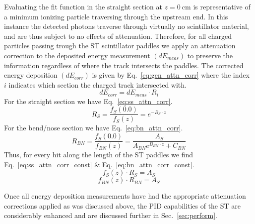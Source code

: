Evaluating the fit function in the straight section at $z = 0\ \mathrm{cm}$ is representative of a minimum ionizing particle traversing through the upstream end.  In this instance the detected photons traverse through virtually no scintillator material, and are thus subject to no effects of attenuation.  Therefore, for all charged particles passing trough the ST scintillator paddles we apply an attenuation correction to the deposited energy measurement $(dE_{meas})$ to preserve the information regardless of where the track intersects the paddles.  The corrected energy deposition $(dE_{corr})$ is given by Eq.~\ref{eq:gen_attn_corr} where the index $i$ indicates which section the charged track intersected with.
	\begin{equation} \label{eq:gen_attn_corr}
		dE_{corr} = dE_{meas} \cdot R_{i}
	\end{equation}
For the straight section we have Eq.~\ref{eq:ss_attn_corr}.
	\begin{equation} \label{eq:ss_attn_corr}
		R_{S} = \frac{f_{S}(0.0)}{f_{S}(z)} = e^{-B_{S} \cdot z}
	\end{equation}
For the bend/nose section we have Eq.~\ref{eq:bn_attn_corr}.
	\begin{equation} \label{eq:bn_attn_corr}
		R_{BN} = \frac{f_{S}(0.0)}{f_{BN}(z)} = \frac{A_{S}}{A_{BN}e^{B_{BN} \cdot z} + C_{BN}}
	\end{equation}
Thus, for every hit along the length of the ST paddles we find Eq.~\ref{eq:ss_attn_corr_const} \& Eq.~\ref{eq:bn_attn_corr_const}.
	\begin{equation} \label{eq:ss_attn_corr_const}
		f_{S}(z) \cdot R_{S} = A_{S}
	\end{equation}
	\begin{equation} \label{eq:bn_attn_corr_const}
		f_{BN}(z) \cdot R_{BN} = A_{S}
	\end{equation}

Once all energy deposition measurements have had the appropriate attenuation corrections applied as was discussed above, the PID capabilities of the ST are considerably enhanced and are discussed further in Sec.~\ref{sec:perform}.


